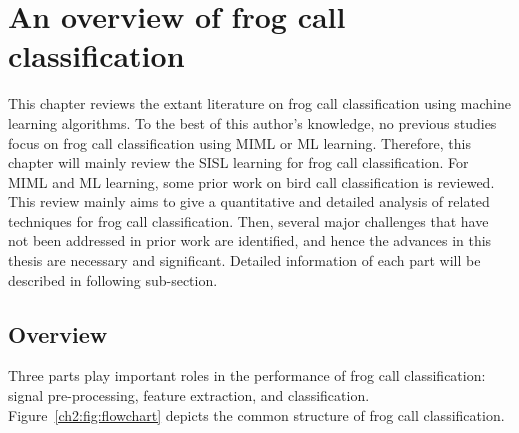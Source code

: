 
\chapter[Literature review]{An overview of frog call classification}
\label{cha:cha2LiteratureReview}

This chapter reviews the extant literature on frog call classification using machine learning algorithms. To the best of this author's knowledge, no previous studies focus on frog call classification using MIML or ML learning. Therefore, this chapter will mainly review the SISL learning for frog call classification. For MIML and ML learning, some prior work on bird call classification is reviewed. This review mainly aims to give a quantitative and detailed analysis of related techniques for frog call classification. 
Then, several major challenges that have not been addressed in prior work are identified, and hence the advances in this thesis are necessary and significant. Detailed information of each part will be described in following sub-section.

\section{Overview}
Three parts play important roles in the performance of frog call classification: signal pre-processing, feature extraction, and classification. Figure~\ref{ch2:fig:flowchart} depicts the common structure of frog call classification.

